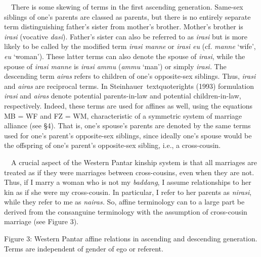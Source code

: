 \ \ There is some skewing of terms in the first ascending generation. Same-sex siblings of one{\textquoteright}s parents are classed as parents, but there is no entirely separate term distinguishing father{\textquoteright}s sister from mother{\textquoteright}s brother. Mother{\textquoteright}s brother is \textit{irasi }(vocative \textit{dasi}). Father{\textquoteright}s sister can also be referred to as \textit{irasi} but is more likely to be called by the modified term \textit{irasi manne }or \textit{irasi eu }(cf. \textit{manne }{\textquoteleft}wife{\textquoteright}, \textit{eu }{\textquoteleft}woman{\textquoteright}). These latter terms can also denote the spouse of \textit{irasi}, while the spouse of \textit{irasi manne }is \textit{irasi ammu }(\textit{ammu }{\textquoteleft}man{\textquoteright}) or simply \textit{irasi.} The descending term \textit{airas }refers to children of one{\textquoteright}s opposite-sex siblings. Thus, \textit{irasi }and \textit{airas }are reciprocal terms. In Steinhauer{\
textquoteright}s (1993) formulation \textit{irasi }and \textit{airas }denote potential parents-in-law and potential children-in-law, respectively. Indeed, these terms are used for affines as well, using the equations MB = WF and FZ = WM, characteristic of a symmetric system of marriage alliance (see {\S}4). That is, one{\textquoteright}s spouse{\textquoteright}s parents are denoted by the same terms used for one{\textquoteright}s parent{\textquoteright}s opposite-sex siblings, since ideally one{\textquoteright}s spouse would be the offspring of one{\textquoteright}s parent{\textquoteright}s opposite-sex sibling, i.e., a cross-cousin. 

\ \ A crucial aspect of the Western Pantar kinship system is that all marriages are treated as if they were marriages between cross-cousins, even when they are not. Thus, if I marry a woman who is not my \textit{baddang}, I assume relationships to her kin as if she were my cross-cousin. In particular, I refer to her parents as \textit{nirasi}, while they refer to me as \textit{nairas. }So, affine terminology can to a large part be derived from the consanguine terminology with the assumption of cross-cousin marriage (see Figure 3).

{\centering
Figure 3: Western Pantar affine relations in ascending and descending generation. Terms are independent of gender of ego or referent. 
\par}

{\centering   [Warning: Image ignored] %
 \par}

